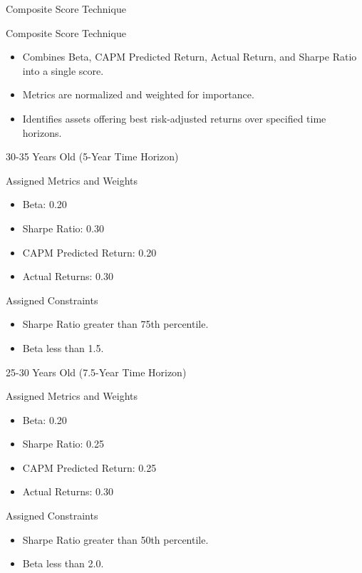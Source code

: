 \documentclass{beamer}
\begin{document}
\begin{frame}{Composite Score Technique}
    \begin{block}{Composite Score Technique}
        \begin{itemize}
            \item Combines Beta, CAPM Predicted Return, Actual Return, and Sharpe Ratio into a single score.
            \item Metrics are normalized and weighted for importance.
            \item Identifies assets offering best risk-adjusted returns over specified time horizons.
        \end{itemize}
    \end{block}
\end{frame}


\begin{frame}{30-35 Years Old (5-Year Time Horizon)}
    \begin{block}{Assigned Metrics and Weights}
        \begin{itemize}
            \item Beta: 0.20
            \item Sharpe Ratio: 0.30
            \item CAPM Predicted Return: 0.20
            \item Actual Returns: 0.30
        \end{itemize}
    \end{block}
    \begin{block}{Assigned Constraints}
        \begin{itemize}
            \item Sharpe Ratio greater than 75th percentile.
            \item Beta less than 1.5.
        \end{itemize}
    \end{block}
\end{frame}

\begin{frame}{25-30 Years Old (7.5-Year Time Horizon)}
    \begin{block}{Assigned Metrics and Weights}
        \begin{itemize}
            \item Beta: 0.20
            \item Sharpe Ratio: 0.25
            \item CAPM Predicted Return: 0.25
            \item Actual Returns: 0.30
        \end{itemize}
    \end{block}
    \begin{block}{Assigned Constraints}
        \begin{itemize}
            \item Sharpe Ratio greater than 50th percentile.
            \item Beta less than 2.0.
        \end{itemize}
    \end{block}
\end{frame}
\end{document}
